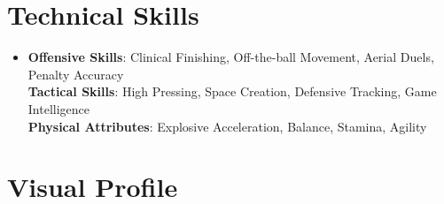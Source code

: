 \documentclass[letterpaper,11pt]{article}
\begin{document}
\section{Technical Skills}
\begin{itemize}[leftmargin=0.15in, label={}]
\item{
\textbf{Offensive Skills}{: Clinical Finishing, Off-the-ball Movement, Aerial Duels, Penalty Accuracy} \\
\textbf{Tactical Skills}{: High Pressing, Space Creation, Defensive Tracking, Game Intelligence} \\
\textbf{Physical Attributes}{: Explosive Acceleration, Balance, Stamina, Agility}
}
\end{itemize}

\section{Visual Profile}
\begin{center}
\end{center}
\end{document}
